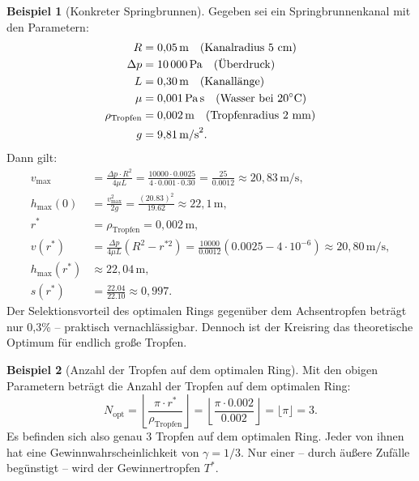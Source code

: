 ﻿\documentclass[a4paper,12pt]{article}
\theoremstyle{definition}
\newtheorem{beispiel}{Beispiel}
\begin{document}
\begin{beispiel}[Konkreter Springbrunnen]
    Gegeben sei ein Springbrunnenkanal mit den Parametern:
    \begin{align*}
        R &= 0{,}05\,\text{m} \quad \text{(Kanalradius 5 cm)} \\
        \Delta p &= 10\,000\,\text{Pa} \quad \text{(Überdruck)} \\
        L &= 0{,}30\,\text{m} \quad \text{(Kanallänge)} \\
        \mu &= 0{,}001\,\text{Pa\,s} \quad \text{(Wasser bei }20^\circ\text{C)} \\
        \rho_{\text{Tropfen}} &= 0{,}002\,\text{m} \quad \text{(Tropfenradius 2 mm)} \\
        g &= 9{,}81\,\text{m/s}^2.
    \end{align*}
    Dann gilt:
    \begin{align*}
        v_{\max} &= \frac{\Delta p \cdot R^2}{4\mu L}
        = \frac{10000 \cdot 0.0025}{4 \cdot 0.001 \cdot 0.30}
        = \frac{25}{0.0012} \approx 20{,}83\,\text{m/s}, \\[4pt]
        h_{\max}(0) &= \frac{v_{\max}^2}{2g} = \frac{(20.83)^2}{19.62} \approx 22{,}1\,\text{m}, \\[4pt]
        r^* &= \rho_{\text{Tropfen}} = 0{,}002\,\text{m}, \\[4pt]
        v(r^*) &= \frac{\Delta p}{4\mu L}(R^2 - r^{*2})
        = \frac{10000}{0.0012}\left(0.0025 - 4\cdot 10^{-6}\right)
        \approx 20{,}80\,\text{m/s}, \\[4pt]
        h_{\max}(r^*) &\approx 22{,}04\,\text{m}, \\[4pt]
        s(r^*) &= \frac{22.04}{22.10} \approx 0{,}997.
    \end{align*}
    Der Selektionsvorteil des optimalen Rings gegenüber dem Achsentropfen beträgt
    nur 0,3\% -- praktisch vernachlässigbar. Dennoch ist der Kreisring das theoretische
    Optimum für endlich große Tropfen.
\end{beispiel}

\begin{beispiel}[Anzahl der Tropfen auf dem optimalen Ring]
    Mit den obigen Parametern beträgt die Anzahl der Tropfen auf dem optimalen Ring:
    \[
    N_{\text{opt}} = \left\lfloor \frac{\pi \cdot r^*}{\rho_{\text{Tropfen}}} \right\rfloor
    = \left\lfloor \frac{\pi \cdot 0.002}{0.002} \right\rfloor = \lfloor \pi \rfloor = 3.
    \]
    Es befinden sich also genau 3 Tropfen auf dem optimalen Ring. Jeder von ihnen hat
    eine Gewinnwahrscheinlichkeit von $\gamma = 1/3$. Nur einer -- durch äußere Zufälle
    begünstigt -- wird der Gewinnertropfen $T^*$.
\end{beispiel}
\end{document}
